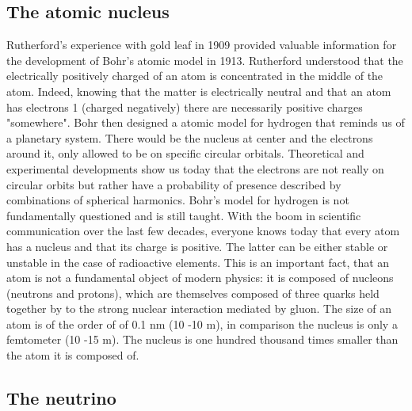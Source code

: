 \subsection{The atomic nucleus}

Rutherford's experience with gold leaf in 1909 provided valuable information for the development of Bohr's atomic model in 1913. Rutherford understood that the electrically positively charged of an atom is concentrated in the middle of the atom. Indeed, knowing that the matter is electrically neutral and that an atom has electrons 1 (charged negatively) there are necessarily positive charges "somewhere". Bohr then designed a atomic model for hydrogen that reminds us of a planetary system. There would be the nucleus at center and the electrons around it, only allowed to be on specific circular orbitals.
Theoretical and experimental developments show us today that the electrons are not really on circular orbits but rather have a probability of presence described by combinations of spherical harmonics. Bohr's model for hydrogen is not fundamentally questioned and is still taught. With the boom in scientific communication over the last few decades, everyone knows today that every atom has a nucleus and that its charge is positive. The latter can be either stable or unstable in the case of radioactive elements. 
This is an important fact, that an atom is not a fundamental object of modern physics: it is composed of nucleons (neutrons and protons), which are themselves composed of three quarks held together by
to the strong nuclear interaction mediated by gluon. The size of an atom is of the order of
of 0.1 nm (10 -10 m), in comparison the nucleus is only a femtometer (10 -15 m). The nucleus
is one hundred thousand times smaller than the atom it is composed of.


\subsection{The neutrino}

